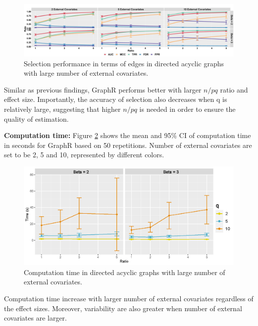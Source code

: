\documentclass[
]{book}
\begin{document}
\begin{figure}

{\centering \includegraphics[width=1\linewidth]{images/highq_node} 

}

\caption{Selection performance in terms of edges in directed acyclic graphs with large number of external covariates.}\label{fig:largeqnode}
\end{figure}

Similar as previous findings, GraphR performs better with larger \(n/pq\) ratio and effect size. Importantly, the accuracy of selection also decreases when q is relatively large, suggesting that higher \(n/pq\) is needed in order to ensure the quality of estimation.

\textbf{Computation time: }
Figure \ref{fig:HighqTime} shows the mean and 95\% CI of computation time in seconds for GraphR based on 50 repetitions. Number of external covariates are set to be 2, 5 and 10, represented by different colors.

\begin{figure}

{\centering \includegraphics[width=1\linewidth]{images/highq_time} 

}

\caption{Computation time in directed acyclic graphs with large number of external covariates.}\label{fig:HighqTime}
\end{figure}

Computation time increase with larger number of external covariates regardless of the effect sizes. Moreover, variability are also greater when number of external covariates are larger.
\end{document}
